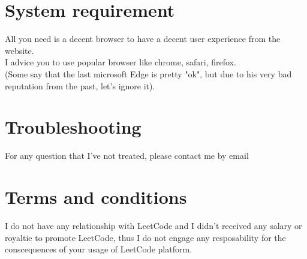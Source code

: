\documentclass[12pt, letterpaper]{article}
\begin{document}
\section{System requirement}
All you need is a decent browser to have a decent user experience from the website.\\
I advice you to use popular browser like chrome, safari, firefox.\\
(Some say that the last microsoft Edge is pretty "ok", but due to his very bad reputation from the past, let's ignore it).
\section{Troubleshooting}
For any question that I've not treated, please contact me by email
\section{Terms and conditions}
I do not have any relationship with LeetCode and I didn't received any salary or royaltie to promote LeetCode, thus I do not engage any resposability for the conscequences of your usage of LeetCode platform.
\end{document}
